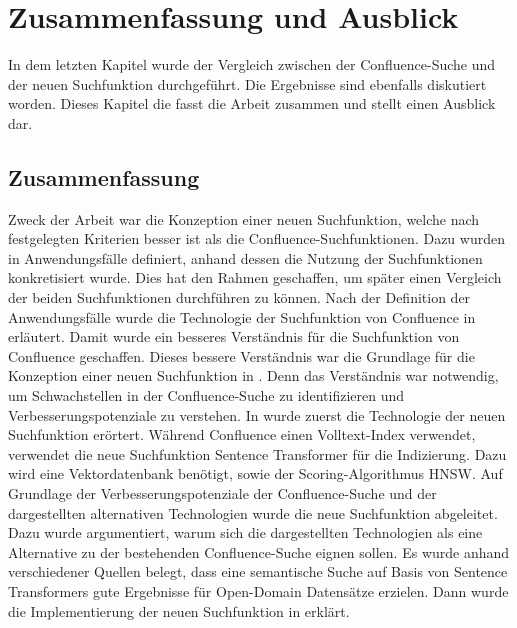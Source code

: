 \chapter{Zusammenfassung und Ausblick}
In dem letzten Kapitel wurde der Vergleich zwischen der Confluence-Suche und der neuen Suchfunktion durchgeführt.
Die Ergebnisse sind ebenfalls diskutiert worden.
Dieses Kapitel die fasst die Arbeit zusammen und stellt einen Ausblick dar.

\section{Zusammenfassung}
Zweck der Arbeit war die Konzeption einer neuen Suchfunktion, welche nach festgelegten Kriterien besser ist als die Confluence-Suchfunktionen.
Dazu wurden in  Anwendungsfälle definiert, anhand dessen die Nutzung der Suchfunktionen konkretisiert wurde.
Dies hat den Rahmen geschaffen, um später einen Vergleich der beiden Suchfunktionen durchführen zu können.
Nach der Definition der Anwendungsfälle wurde die Technologie der Suchfunktion von Confluence in  erläutert.
Damit wurde ein besseres Verständnis für die Suchfunktion von Confluence geschaffen.
Dieses bessere Verständnis war die Grundlage für die Konzeption einer neuen Suchfunktion in .
Denn das Verständnis war notwendig, um Schwachstellen in der Confluence-Suche zu identifizieren und Verbesserungspotenziale zu verstehen.
In  wurde zuerst die Technologie der neuen Suchfunktion erörtert.
Während Confluence einen Volltext-Index verwendet, verwendet die neue Suchfunktion Sentence Transformer für die Indizierung.
Dazu wird eine Vektordatenbank benötigt, sowie der Scoring-Algorithmus HNSW.
Auf Grundlage der Verbesserungspotenziale der Confluence-Suche und der dargestellten alternativen Technologien wurde die neue Suchfunktion abgeleitet.
Dazu wurde argumentiert, warum sich die dargestellten Technologien als eine Alternative zu der bestehenden Confluence-Suche eignen sollen.
Es wurde anhand verschiedener Quellen belegt, dass eine semantische Suche auf Basis von Sentence Transformers gute Ergebnisse für Open-Domain Datensätze erzielen. 
Dann wurde die Implementierung der neuen Suchfunktion in  erklärt.\\

